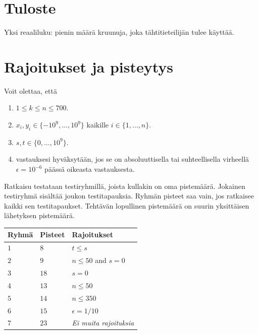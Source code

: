 \section*{Tuloste}

Yksi reaaliluku: pienin määrä kruunuja, joka tähtitieteilijän tulee käyttää.

\section*{Rajoitukset ja pisteytys} %

Voit olettaa, että
\begin{enumerate}
\item $1\leq k\leq n\leq 700$. %
\item $x_i, y_i\in \{-10^9,\ldots, 10^9\}$ kaikille $i\in\{1,\ldots,n\}$. %
\item $s,t\in \{0,\ldots, 10^9\}$. %
\item vastauksesi hyväksytään, jos se on absoluuttisella tai suhteellisella virheellä $\epsilon = 10^{-6}$ päässä oikeasta vastauksesta.
\end{enumerate}


Ratkaisu testataan testiryhmillä, joista kullakin on oma pistemäärä.
Jokainen testiryhmä sisältää joukon testitapauksia.
Ryhmän pisteet saa vain, jos ratkaisee kaikki sen testitapaukset.
Tehtävän lopullinen pistemäärä on suurin yksittäisen lähetyksen pistemäärä.

\medskip
\noindent
\begin{tabular}{lll}
  Ryhmä & Pisteet & Rajoitukset\\\hline
  $1$ & $8$ &  $t\leq s$\\
  $2$ & $9$ & $n\le 50$ and $s=0$\\
  $3$ & $18$ & $s=0$\\
  $4$ & $13$ & $n\leq 50$\\
  $5$ & $14$ & $n\leq 350$\\
  $6$ & $15$ & $\epsilon = 1/10$\\
  $7$ & $23$ & \emph{Ei muita rajoituksia}\\
\end{tabular}

